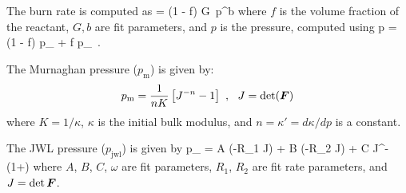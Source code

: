 The burn rate is computed as
\Beq
   = (1 - f) G \,p^b
\Eeq
where $f$ is the volume fraction of the reactant, $G, b$ are fit parameters, and
$p$ is the pressure, computed using
\Beq
  p = (1 - f) p_{} + f p_{} \,.
\Eeq

The Murnaghan pressure ($p_{\text{m}}$) is given by:
\begin{equation}
  p_{\text{m}} = \frac{1}{nK}\left[J^{-n} - 1\right] ~,~~ J = \det(\boldsymbol{F})
\end{equation}
where $K = 1/\kappa$, $\kappa$ is the initial bulk modulus, and $n = \kappa' = d\kappa/dp$ 
is a constant.

The JWL pressure ($p_{\text{jwl}}$) is given by
\Beq
  p_{} = A \exp(-R_1 J) + B \exp(-R_2 J) + C J^{-(1+\omega)}
\Eeq
where $A$, $B$, $C$, $\omega$ are fit parameters, $R_1$, $R_2$ are fit rate parameters, 
and $J = \det\boldsymbol{F}$.


